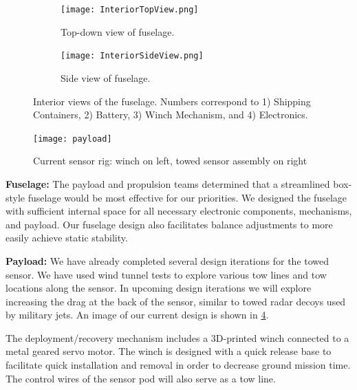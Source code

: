 \documentclass[proposal]{byu-aero}
\begin{document}
\begin{figure}[h!]
	\centering
	\begin{subfigure}[t]{0.475\textwidth} %
		\centering
		\texttt{[image: InteriorTopView.png]}
		\caption{Top-down view of fuselage.}
		\label{fig:chorddist}
	\end{subfigure}
	\hfill
	\begin{subfigure}[t]{0.475\textwidth} %
		\centering
		 \texttt{[image: InteriorSideView.png]}
		\caption{Side view of fuselage.}
		\label{fig:twistdist}
	\end{subfigure}
	\caption{Interior views of the fuselage. Numbers correspond to 1) Shipping Containers, 2) Battery, 3) Winch Mechanism, and 4) Electronics.}
	\label{fig:rotorgeom}
\end{figure}

\begin{figure}
	\centering
	\vspace*{-14pt}
	\texttt{[image: payload]}
	\caption{Current sensor rig: winch on left, towed sensor assembly on right}
	\label{fig:Payload CAD}
\end{figure}

\vspace*{-1em}

\noindent \textbf{Fuselage:} The payload and propulsion teams determined that a streamlined box-style fuselage would be most effective for our priorities. We designed the fuselage with sufficient internal space for all necessary electronic components, mechanisms, and payload. Our fuselage design also facilitates balance adjustments to more easily achieve static stability.

\noindent \textbf{Payload:} We have already completed several design iterations for the towed sensor. We have used wind tunnel tests to explore various tow lines and tow locations along the sensor. In upcoming design iterations we will explore increasing the drag at the back of the sensor, similar to towed radar decoys used by military jets. An image of our current design is shown in \cref{fig:Payload CAD}.

The deployment/recovery mechanism includes a 3D-printed winch connected to a metal geared servo motor. The winch is designed with a quick release base to facilitate quick installation and removal in order to decrease ground mission time. The control wires of the sensor pod will also serve as a tow line. 
\end{document}
